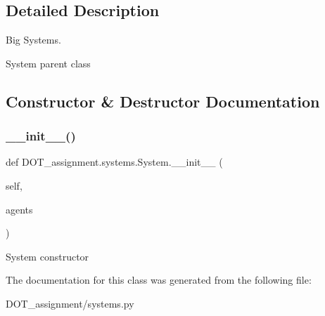 \subsection{Detailed Description}
Big Systems. 

\begin{DoxyVerb}System parent class
\end{DoxyVerb}
 

\subsection{Constructor \& Destructor Documentation}
\mbox{\label{class_d_o_t__assignment_1_1systems_1_1_system_a7a3d17f1f8331c684a408ddbc6c44ed2}} 
\subsubsection{\texorpdfstring{\_\_init\_\_()}{\_\_init\_\_()}}
{\footnotesize\ttfamily def D\+O\+T\+\_\+assignment.\+systems.\+System.\+\_\+\+\_\+init\+\_\+\+\_\+ (\begin{DoxyParamCaption}\item[{}]{self,  }\item[{}]{agents }\end{DoxyParamCaption})}

\begin{DoxyVerb}System constructor
\end{DoxyVerb}
 

The documentation for this class was generated from the following file\+:\begin{DoxyCompactItemize}
\item 
D\+O\+T\+\_\+assignment/systems.\+py\end{DoxyCompactItemize}
